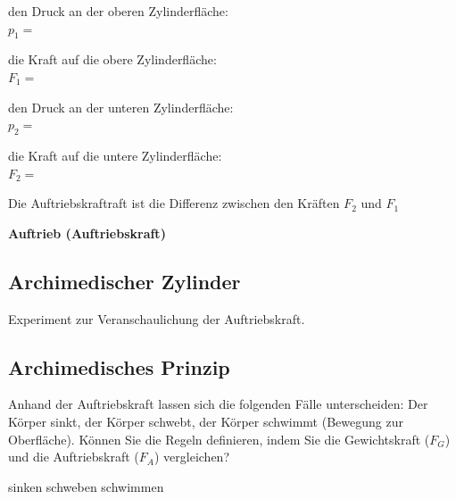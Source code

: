 \documentclass[11pt]{article}
\begin{document}
den Druck an der oberen Zylinderfläche: \\
$p_1 =$ \vspace{0.5cm} 

die Kraft auf die obere Zylinderfläche: \\
$F_1 = $ \vspace{0.5cm}

den Druck an der unteren Zylinderfläche: \\
$p_2 = $ \vspace{0.5cm}

die Kraft auf die untere Zylinderfläche: \\
$F_2 = $ \vspace{0.5cm}


Die Auftriebskraftraft ist die Differenz zwischen den Kräften $F_2$ und $F_1$ 
\vspace{3cm}


\begin{tcolorbox}[width=\textwidth, %
    colback=white,colframe=gray!75!black]
    \textbf{Auftrieb (Auftriebskraft)}
    \vspace{3cm}
\end{tcolorbox}

\newpage

\subsection*{Archimedischer Zylinder}

Experiment zur Veranschaulichung der Auftriebskraft.

\vfill

\subsection*{Archimedisches Prinzip}

Anhand der Auftriebskraft lassen sich die folgenden Fälle unterscheiden: Der Körper sinkt, der Körper schwebt, der Körper schwimmt (Bewegung zur Oberfläche). Können Sie die Regeln definieren, indem Sie die Gewichtskraft ($F_G$) und die Auftriebskraft ($F_A$) vergleichen?

\hspace{1.5cm} sinken \hspace{4cm} schweben \hspace{4cm} schwimmen
\end{document}
